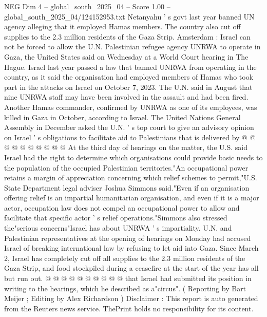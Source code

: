 \begin{textsample}{NEG Dim 4 – global\_south\_2025\_04 – Score 1.00 – global\_south\_2025\_04/124152953.txt}  \label{ex:f4_neg_232}
Netanyahu ' s govt last year banned UN agency alleging that it employed Hamas members.
The country also cut off supplies to the 2.3 million residents of the Gaza Strip.
Amsterdam : Israel can not be forced to allow the U.N.
Palestinian refugee agency UNRWA to operate in Gaza, the United States said on Wednesday at a World Court hearing in The Hague.
Israel last year passed a law that banned UNRWA from operating in the country, as it said the organisation had employed members of Hamas who took part in the attacks on Israel on October 7, 2023.
The U.N. said in August that nine UNRWA staff may have been involved in the assault and had been fired.
Another Hamas commander, confirmed by UNRWA as one of its employees, was killed in Gaza in October, according to Israel.
The United Nations General Assembly in December asked the U.N. ' s top court to give an advisory opinion on Israel ' s obligations to facilitate aid to Palestinians that is delivered by @ @ @ @ @ @ @ @ @ @ At the third day of hearings on the matter, the U.S. said Israel had the right to determine which organisations could provide basic needs to the population of the occupied Palestinian territories."An occupational power retains a margin of appreciation concerning which relief schemes to permit,"U.S.
State Department legal adviser Joshua Simmons said."Even if an organisation offering relief is an impartial humanitarian organisation, and even if it is a major actor, occupation law does not compel an occupational power to allow and facilitate that specific actor ' s relief operations."Simmons also stressed the"serious concerns"Israel has about UNRWA ' s impartiality.
U.N. and Palestinian representatives at the opening of hearings on Monday had accused Israel of breaking international law by refusing to let aid into Gaza.
Since March 2, Israel has completely cut off all supplies to the 2.3 million residents of the Gaza Strip, and food stockpiled during a ceasefire at the start of the year has all but run out. @ @ @ @ @ @ @ @ @ @ that Israel had submitted its position in writing to the hearings, which he described as a"circus". ( Reporting by Bart Meijer ; Editing by Alex Richardson ) Disclaimer : This report is auto generated from the Reuters news service.
ThePrint holds no responsibility for its content.

\end{textsample}
